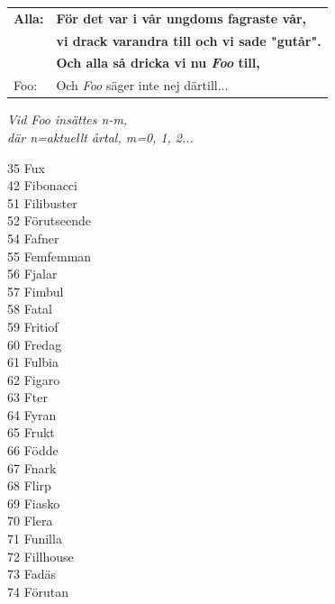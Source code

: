 \documentclass[a6paper, 10pt, twoside]{article}
\begin{document}
\noindent
\begin{center}
\end{center}
\begin{lyrics}
\vspace{-15pt}
\begin{table}[!h]
\begin{tabularx}{0.75\textwidth}{l l}
\textbf{\small Alla:} & \textbf{\small För det var i vår ungdoms fagraste vår, }\\
 &\textbf{\small vi drack varandra till och vi sade "gutår".}\\
 &\textbf{\small Och alla så dricka vi nu \textit{Foo} till,}\\
\small Foo: &\small Och \textit{Foo} säger inte nej därtill...
\end{tabularx}\physicalonly{\vspace{-20pt}}\end{table}
\begin{center}
\textit{Vid Foo insättes n-m,\\där n=aktuellt årtal, m=0, 1, 2...}
\end{center}%
\begin{minipage}[t]{0.3\textwidth}\small
35 Fux\\
42 Fibonacci\\
51 Filibuster\\
52 Förutseende\\
54 Fafner\\
55 Femfemman\\
56 Fjalar\\
57 Fimbul\\
58 Fatal\\
59 Fritiof\\
60 Fredag\\
61 Fulbia\\
62 Figaro\\
63 Fter\\
64 Fyran\\
65 Frukt\\
66 Födde\\
67 Fnark\\
68 Flirp\\
69 Fiasko\\
70 Flera\\
71 Funilla\\
72 Fillhouse \\
73 Fadäs\\
74 Förutan\\

\end{minipage}
\end{lyrics}
\end{document}
